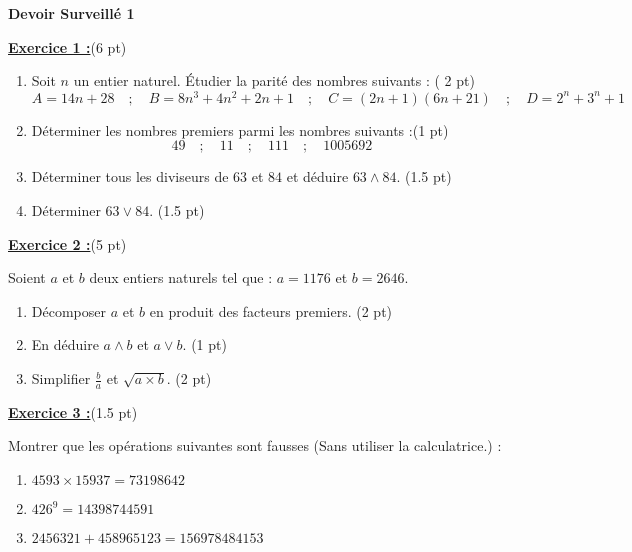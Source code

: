 \documentclass[12pt,a4paper]{article}
\begin{document}
\pagestyle{fancy}
\fancyhf{} %


\begin{center}
    \textbf{\Large  Devoir Surveillé 1}
\end{center}

\underline{\large\textbf{Exercice 1 :}}(6 pt)
\begin{enumerate}
    \item Soit $n$ un entier naturel. Étudier la parité des nombres suivants : ( 2 pt)
    $$A = 14n + 28\quad;\quad B = 8n^3 + 4n^2 + 2n + 1 \quad;\quad C = (2n + 1)(6n + 21) \quad ; \quad D = 2^n + 3^n + 1$$
    \item Déterminer les nombres premiers parmi les nombres suivants :(1 pt)
    $$49\quad;\quad 11\quad;\quad 111\quad;\quad 1005692$$
    \item Déterminer tous les diviseurs de $63$ et $84$ et déduire $63\wedge 84$. (1.5 pt)
    \item Déterminer $63\vee 84$. (1.5 pt)
\end{enumerate}

\underline{\large\textbf{Exercice 2 :}}(5 pt)

Soient $a$ et $b$ deux entiers naturels tel que : $a = 1176$ et $b = 2646$.
\begin{enumerate}
    \item Décomposer $a$ et $b$ en produit des facteurs premiers. (2 pt)
    \item En déduire $a\wedge b$ et $a\vee b$. (1 pt)
    \item Simplifier $\displaystyle\frac{b}{a}$ et $\sqrt{a\times b}$. (2 pt)
    
\end{enumerate}

\underline{\large\textbf{Exercice 3 :}}(1.5 pt)

 Montrer que les opérations suivantes sont fausses (Sans utiliser la calculatrice.) :
    \begin{enumerate}
        \item $4593 \times 15937 = 73198642$
        \item $426^{9} = 14398744591$
        \item $2456321 + 458965123 = 156978484153$
    \end{enumerate}
\end{document}
